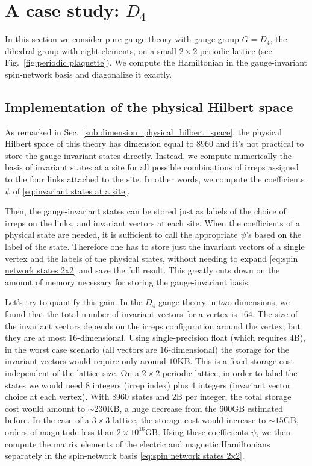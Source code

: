 \section{A case study: \texorpdfstring{$D_4$}{D4}}
\label{sec:a_case_study__d4}



In this section we consider pure gauge theory with gauge group $G=D_4$, the dihedral group with eight elements, on a small $2 \times 2 $ periodic lattice (see Fig.~\ref{fig:periodic plaquette}).
We compute the Hamiltonian in the gauge-invariant spin-network basis and diagonalize it exactly.

\subsection{Implementation of the physical Hilbert space}
\label{sub:implementation_of_the_physical_hilbert_space}

As remarked in Sec.~\ref{sub:dimension_physical_hilbert_space}, the physical Hilbert space of this theory has dimension equal to $8960$ and it's not practical to store the gauge-invariant states directly.
Instead, we compute numerically the basis of invariant states at a site for all possible combinations of irreps assigned to the four links attached to the site.
In other words, we compute the coefficients $\psi$ of \eqref{eq:invariant states at a site}.

Then, the gauge-invariant states can be stored just as labels of the choice of \acp{irrep} on the links, and invariant vectors at each site.
When the coefficients of a physical state are needed, it is sufficient to call the appropriate $\psi$'s based on the label of the state.
Therefore one has to store just the invariant vectors of a single vertex and the labels of the physical states, without needing to expand \eqref{eq:spin network states 2x2} and save the full result.
This greatly cuts down on the amount of memory necessary for storing the gauge-invariant basis.

Let's try to quantify this gain.
In the $D_4$ gauge theory in two dimensions, we found that the total number of invariant vectors for a vertex is $164$.
The size of the invariant vectors depends on the \acp{irrep} configuration around the vertex, but they are at most $16$-dimensional.
Using single-precision float (which requires $4 \mathrm{B}$), in the worst case scenario (all vectors are $16$-dimensional) the storage for the invariant vectors would require only around $10 \mathrm{KB}$.
This is a fixed storage cost independent of the lattice size.
On a $2 \times 2$ periodic lattice, in order to label the states we would need $8$ integers (\ac{irrep} index) plus $4$ integers (invariant vector choice at each vertex).
With $8960$ states and $2 \mathrm{B}$ per integer, the total storage cost would amount to $\sim \! 230 \mathrm{KB}$, a huge decrease from the $600 \mathrm{GB}$ estimated before.
In the case of a $3 \times 3$ lattice, the storage cost would increase to $\sim \! 15 \mathrm{GB}$, orders of magnitude less than $2 \times 10^{16} \mathrm{GB}$.
Using these coefficients $\psi$, we then compute the matrix elements of the electric and magnetic Hamiltonians separately in the spin-network basis \eqref{eq:spin network states 2x2}.


